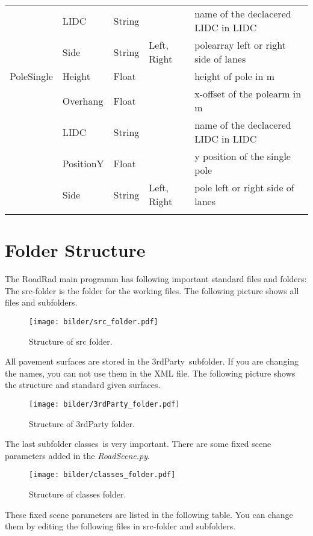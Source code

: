 \documentclass[10pt,a4paper]{report}
\newcommand{\mymidrule}{\specialrule{0.1em}{0em}{0em}}
\newcommand{\mybottomrule}{\specialrule{0.2em}{0em}{0em}}
\begin{document}
\begin{landscape}
\begin{longtable}{lllp{4cm}p{6cm}}
		 & LIDC & String & & name of the declacered LIDC in LIDC \\\rowcolor{hellgrau}
		 & Side & String & Left, Right & polearray left or right side of lanes \\
	\mymidrule
		PoleSingle & Height & Float & & height of pole in m \\
		 & Overhang & Float & & x-offset of the polearm in m \\
		 & LIDC & String & & name of the declacered LIDC in LIDC \\
		 & PositionY & Float & & y position of the single pole \\ 
		 & Side & String & Left, Right & pole left or right side of lanes \\
	\mybottomrule
	\end{longtable} 

\end{landscape}

\chapter{Folder Structure}
\label{chap:folder_struc}

The RoadRad main programm has following important standard files and folders:
The src-folder is the folder for the working files. The following picture shows all files and subfolders.
\begin{figure}[H]
\texttt{[image: bilder/src\_folder.pdf]} 
\caption{Structure of src folder.}
\end{figure}

All pavement surfaces are stored in the \glqq 3rdParty\grqq\ subfolder. If you are changing the names, you can not use them in the XML file. The following picture shows the structure and standard given surfaces.
\begin{figure}[H]
\texttt{[image: bilder/3rdParty\_folder.pdf]} 
\caption{Structure of 3rdParty folder.}
\end{figure}

The last subfolder \glqq classes\grqq\ is very important. There are some fixed scene parameters added in the \textit{RoadScene.py}.
\begin{figure}[H]
\texttt{[image: bilder/classes\_folder.pdf]} 
\caption{Structure of classes folder.}
\end{figure}


These fixed scene parameters are listed in the following table. You can change them by editing the following files in src-folder and subfolders.
\end{document}
